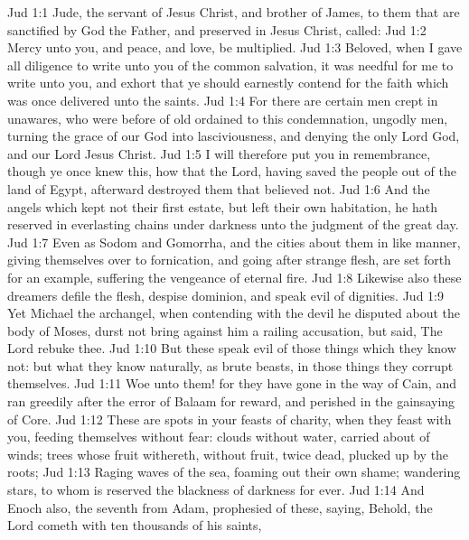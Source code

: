 \vs Jud 1:1 Jude, the servant of Jesus Christ, and brother of James, to them that are sanctified by God the Father, and preserved in Jesus Christ,  called:
\vs Jud 1:2 Mercy unto you, and peace, and love, be multiplied.
\vs Jud 1:3 Beloved, when I gave all diligence to write unto you of the common salvation, it was needful for me to write unto you, and exhort  that ye should earnestly contend for the faith which was once delivered unto the saints.
\vs Jud 1:4 For there are certain men crept in unawares, who were before of old ordained to this condemnation, ungodly men, turning the grace of our God into lasciviousness, and denying the only Lord God, and our Lord Jesus Christ.
\vs Jud 1:5 I will therefore put you in remembrance, though ye once knew this, how that the Lord, having saved the people out of the land of Egypt, afterward destroyed them that believed not.
\vs Jud 1:6 And the angels which kept not their first estate, but left their own habitation, he hath reserved in everlasting chains under darkness unto the judgment of the great day.
\vs Jud 1:7 Even as Sodom and Gomorrha, and the cities about them in like manner, giving themselves over to fornication, and going after strange flesh, are set forth for an example, suffering the vengeance of eternal fire.
\vs Jud 1:8 Likewise also these  dreamers defile the flesh, despise dominion, and speak evil of dignities.
\vs Jud 1:9 Yet Michael the archangel, when contending with the devil he disputed about the body of Moses, durst not bring against him a railing accusation, but said, The Lord rebuke thee.
\vs Jud 1:10 But these speak evil of those things which they know not: but what they know naturally, as brute beasts, in those things they corrupt themselves.
\vs Jud 1:11 Woe unto them! for they have gone in the way of Cain, and ran greedily after the error of Balaam for reward, and perished in the gainsaying of Core.
\vs Jud 1:12 These are spots in your feasts of charity, when they feast with you, feeding themselves without fear: clouds  without water, carried about of winds; trees whose fruit withereth, without fruit, twice dead, plucked up by the roots;
\vs Jud 1:13 Raging waves of the sea, foaming out their own shame; wandering stars, to whom is reserved the blackness of darkness for ever.
\vs Jud 1:14 And Enoch also, the seventh from Adam, prophesied of these, saying, Behold, the Lord cometh with ten thousands of his saints,
